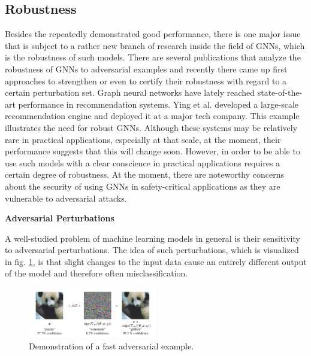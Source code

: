 \documentclass[a4paper,preprint]{sig-alternate}
\begin{document}
\subsection{Robustness}

Besides the repeatedly demonstrated good performance, there is one major issue that is subject to a rather new branch of 
research inside the field of GNNs, which is the robustness of such models. There are several publications that analyze 
the robustness of GNNs to adversarial examples and recently there came up first approaches to strengthen
or even to certify their robustness with regard to a certain perturbation set.\newline
Graph neural networks have lately reached state-of-the-art performance in recommendation systems. \cite{Ying_2018}
Ying et al. developed a large-scale recommendation engine and deployed it at a major tech company.
This example illustrates the need for robust GNNs. Although these systems may be relatively rare in practical applications, especially at
that scale, at the moment, their performance suggests that this will change soon. However, in order to be able to use such models
with a clear conscience in practical applications requires a certain degree of robustness.
At the moment, there are noteworthy concerns about the security of using GNNs in safety-critical applications as they are
vulnerable to adversarial attacks. \cite{Jin_2020_Graph}\newline

\textbf{Adversarial Perturbations}\newline

A well-studied problem of machine learning models in general is their sensitivity to adversarial perturbations. \cite{Goodfellow_2015}
The idea of such perturbations, which is visualized in fig. \ref{fig:adversarial_example}, is that slight changes to the input data
cause an entirely different output of the model and therefore often misclassification.

\begin{figure}[h]
    \centering
    \includegraphics[width=0.5\textwidth]{img/adversarial_example.png}
    \caption{Demonstration of a fast adversarial example. \cite{Goodfellow_2015}}
    \label{fig:adversarial_example}
\end{figure}
\end{document}
